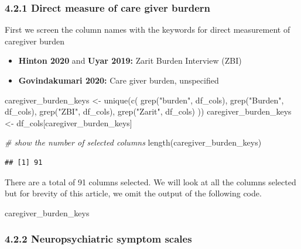 \documentclass[
]{article}
\newenvironment{Shaded}{\begin{snugshade}}{\end{snugshade}}
\newcommand{\CommentTok}[1]{\textcolor[rgb]{0.56,0.35,0.01}{\textit{#1}}}
\newcommand{\FunctionTok}[1]{\textcolor[rgb]{0.00,0.00,0.00}{#1}}
\newcommand{\NormalTok}[1]{#1}
\newcommand{\OtherTok}[1]{\textcolor[rgb]{0.56,0.35,0.01}{#1}}
\newcommand{\StringTok}[1]{\textcolor[rgb]{0.31,0.60,0.02}{#1}}
\providecommand{\tightlist}{%
  \setlength{\itemsep}{0pt}\setlength{\parskip}{0pt}}
\begin{document}
\hypertarget{direct-measure-of-care-giver-burdern}{%
\subsubsection{4.2.1 Direct measure of care giver
burdern}\label{direct-measure-of-care-giver-burdern}}

First we screen the column names with the keywords for direct
measurement of caregiver burden

\begin{itemize}
\tightlist
\item
  \textbf{Hinton 2020} and \textbf{Uyar 2019:} Zarit Burden Interview
  (ZBI)
\item
  \textbf{Govindakumari 2020:} Care giver burden, unspecified
\end{itemize}

\begin{Shaded}
\begin{Highlighting}[]
\NormalTok{caregiver\_burden\_keys }\OtherTok{\textless{}{-}} \FunctionTok{unique}\NormalTok{(}\FunctionTok{c}\NormalTok{(}
    \FunctionTok{grep}\NormalTok{(}\StringTok{"burden"}\NormalTok{, df\_cols),}
    \FunctionTok{grep}\NormalTok{(}\StringTok{"Burden"}\NormalTok{, df\_cols),}
    \FunctionTok{grep}\NormalTok{(}\StringTok{"ZBI"}\NormalTok{, df\_cols),}
    \FunctionTok{grep}\NormalTok{(}\StringTok{"Zarit"}\NormalTok{, df\_cols)}
\NormalTok{    ))}
\NormalTok{caregiver\_burden\_keys }\OtherTok{\textless{}{-}}\NormalTok{ df\_cols[caregiver\_burden\_keys]}

\CommentTok{\# show the number of selected columns}
\FunctionTok{length}\NormalTok{(caregiver\_burden\_keys) }
\end{Highlighting}
\end{Shaded}

\begin{verbatim}
## [1] 91
\end{verbatim}

There are a total of 91 columns selected. We will look at all the
columns selected but for brevity of this article, we omit the output of
the following code.

\begin{Shaded}
\begin{Highlighting}[]
\NormalTok{caregiver\_burden\_keys}
\end{Highlighting}
\end{Shaded}

\hypertarget{neuropsychiatric-symptom-scales}{%
\subsubsection{4.2.2 Neuropsychiatric symptom
scales}\label{neuropsychiatric-symptom-scales}}
\end{document}
